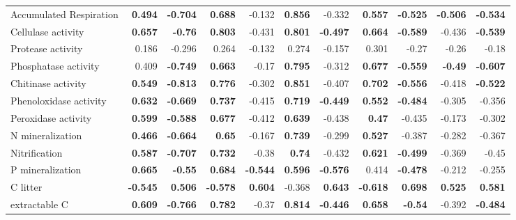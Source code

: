 \documentclass[10pt]{article}
\begin{document}
\begin{flushleft}
\begin{landscape}
\begin{table}[h!]
\begin{center}
{\begin{tabular}{lrrrrrrrrrr}
  Accumulated Respiration & \textbf{ 0.494 } & \textbf{ -0.704 } & \textbf{ 0.688 } & -0.132 & \textbf{ 0.856 } & -0.332 & \textbf{ 0.557 } & \textbf{ -0.525 } & \textbf{ -0.506 } & \textbf{ -0.534 } \\ 
  Cellulase activity & \textbf{ 0.657 } & \textbf{ -0.76 } & \textbf{ 0.803 } & -0.431 & \textbf{ 0.801 } & \textbf{ -0.497 } & \textbf{ 0.664 } & \textbf{ -0.589 } & -0.436 & \textbf{ -0.539 } \\ 
  Protease activity & 0.186 & -0.296 & 0.264 & -0.132 & 0.274 & -0.157 & 0.301 & -0.27 & -0.26 & -0.18 \\ 
  Phosphatase activity & 0.409 & \textbf{ -0.749 } & \textbf{ 0.663 } & -0.17 & \textbf{ 0.795 } & -0.312 & \textbf{ 0.677 } & \textbf{ -0.559 } & \textbf{ -0.49 } & \textbf{ -0.607 } \\ 
  Chitinase activity & \textbf{ 0.549 } & \textbf{ -0.813 } & \textbf{ 0.776 } & -0.302 & \textbf{ 0.851 } & -0.407 & \textbf{ 0.702 } & \textbf{ -0.556 } & -0.418 & \textbf{ -0.522 } \\ 
  Phenoloxidase activity & \textbf{ 0.632 } & \textbf{ -0.669 } & \textbf{ 0.737 } & -0.415 & \textbf{ 0.719 } & \textbf{ -0.449 } & \textbf{ 0.552 } & \textbf{ -0.484 } & -0.305 & -0.356 \\ 
  Peroxidase activity & \textbf{ 0.599 } & \textbf{ -0.588 } & \textbf{ 0.677 } & -0.412 & \textbf{ 0.639 } & -0.438 & \textbf{ 0.47 } & -0.435 & -0.173 & -0.302 \\ 
  N mineralization & \textbf{ 0.466 } & \textbf{ -0.664 } & \textbf{ 0.65 } & -0.167 & \textbf{ 0.739 } & -0.299 & \textbf{ 0.527 } & -0.387 & -0.282 & -0.367 \\ 
  Nitrification & \textbf{ 0.587 } & \textbf{ -0.707 } & \textbf{ 0.732 } & -0.38 & \textbf{ 0.74 } & -0.432 & \textbf{ 0.621 } & \textbf{ -0.499 } & -0.369 & -0.45 \\ 
  P mineralization & \textbf{ 0.665 } & \textbf{ -0.55 } & \textbf{ 0.684 } & \textbf{ -0.544 } & \textbf{ 0.596 } & \textbf{ -0.576 } & 0.414 & \textbf{ -0.478 } & -0.212 & -0.255 \\ 
  C litter & \textbf{ -0.545 } & \textbf{ 0.506 } & \textbf{ -0.578 } & \textbf{ 0.604 } & -0.368 & \textbf{ 0.643 } & \textbf{ -0.618 } & \textbf{ 0.698 } & \textbf{ 0.525 } & \textbf{ 0.581 } \\ 
  extractable C & \textbf{ 0.609 } & \textbf{ -0.766 } & \textbf{ 0.782 } & -0.37 & \textbf{ 0.814 } & \textbf{ -0.446 } & \textbf{ 0.658 } & \textbf{ -0.54 } & -0.392 & \textbf{ -0.484 } \\ 

\end{tabular}}
\end{center}
\end{table}
\end{landscape}
\end{flushleft}
\end{document}
